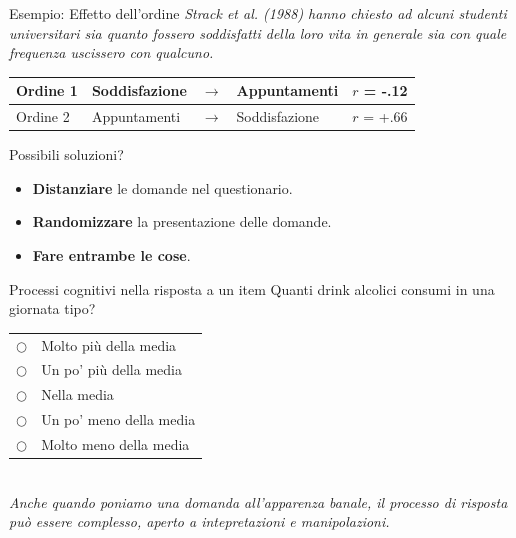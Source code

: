 \documentclass{beamer}
\begin{document}
\begin{frame}{Esempio: Effetto dell'ordine}
\textit{Strack et al. (1988)  hanno chiesto ad alcuni studenti universitari sia quanto fossero soddisfatti della loro vita in generale sia con quale frequenza uscissero con qualcuno.} \\
\vspace{1em}
\centering
\begin{tabular}{l|lclc}
    \toprule
   Ordine 1 & Soddisfazione & $\rightarrow$ & Appuntamenti & $r$ = -.12 \\
   \midrule
   \pause
   Ordine 2 & Appuntamenti & $\rightarrow$ & Soddisfazione & $r$ = +.66 \\
   \bottomrule
\end{tabular}
\vspace{0.3cm}
\begin{block}{Possibili soluzioni?}
\pause
\begin{itemize}
    \item \textbf{Distanziare} le domande nel questionario.
    \pause
    \item \textbf{Randomizzare} la presentazione delle domande.
    \pause
    \item \textbf{Fare entrambe le cose}.
\end{itemize}
\end{block}
\end{frame}

\begin{frame}{Processi cognitivi nella risposta a un item}
Quanti drink alcolici consumi in una giornata tipo? \\
\vspace{0.2cm}
\begin{tabular}{ll}
    $\bigcirc$ & Molto più della media \\
    $\bigcirc$ & Un po' più della media \\
    $\bigcirc$ & Nella media \\
    $\bigcirc$ & Un po' meno della media \\
    $\bigcirc$ & Molto meno della media \\
\end{tabular}
\vspace{1em}
\\ \textit{Anche quando poniamo una domanda all'apparenza banale, il processo di risposta può essere complesso, aperto a intepretazioni e manipolazioni.}
\end{frame}
\end{document}

